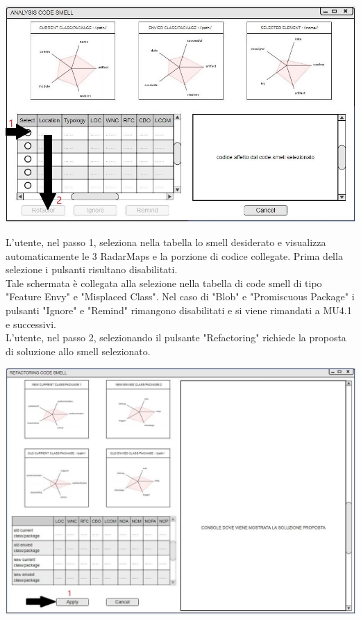 \documentclass[11pt]{article}
\begin{document}
			\includegraphics[width=\columnwidth]{mock-up_analisi1.jpg}
			
			\flushleft
			L'utente, nel passo 1, seleziona nella tabella lo smell desiderato e visualizza automaticamente le 3 RadarMaps e la porzione di codice collegate. Prima della selezione i pulsanti risultano disabilitati.
			\\ \vspace{0.2cm}
			Tale schermata è collegata alla selezione nella tabella di code smell di tipo "Feature Envy" e "Misplaced Class". Nel caso di "Blob" e "Promiscuous Package" i pulsanti "Ignore" e "Remind" rimangono disabilitati e si viene rimandati a MU4.1 e successivi.
			\\\vspace{0.5cm}
			L'utente, nel passo 2, selezionando il pulsante "Refactoring" richiede la proposta di soluzione allo smell selezionato.\\ \vspace{0.5cm}
		
			\includegraphics[width=\columnwidth]{mock-up_refactoring.jpg}
		
\end{document}
